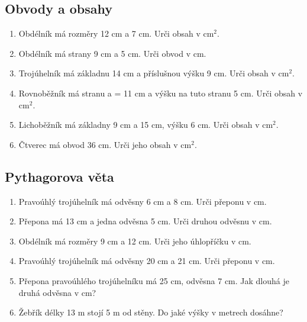 \documentclass[11pt,a4paper]{article}
\begin{document}
\subsection*{Obvody a obsahy}
\begin{enumerate}[label=\arabic*.,start=7,leftmargin=*,itemsep=6pt]
\item Obdélník má rozměry 12 cm a 7 cm. Urči obsah v cm$^2$.\par\vspace{2mm}
\item Obdélník má strany 9 cm a 5 cm. Urči obvod v cm.\par\vspace{2mm}
\item Trojúhelník má základnu 14 cm a příslušnou výšku 9 cm. Urči obsah v cm$^2$.\par\vspace{2mm}
\item Rovnoběžník má stranu a = 11 cm a výšku na tuto stranu 5 cm. Urči obsah v cm$^2$.\par\vspace{2mm}
\item Lichoběžník má základny 9 cm a 15 cm, výšku 6 cm. Urči obsah v cm$^2$.\par\vspace{2mm}
\item Čtverec má obvod 36 cm. Urči jeho obsah v cm$^2$.\par\vspace{2mm}
\end{enumerate}

\subsection*{Pythagorova věta}
\begin{enumerate}[label=\arabic*.,start=13,leftmargin=*,itemsep=6pt]
\item Pravoúhlý trojúhelník má odvěsny 6 cm a 8 cm. Urči přeponu v cm.\par\vspace{2mm}
\item Přepona má 13 cm a jedna odvěsna 5 cm. Urči druhou odvěsnu v cm.\par\vspace{2mm}
\item Obdélník má rozměry 9 cm a 12 cm. Urči jeho úhlopříčku v cm.\par\vspace{2mm}
\item Pravoúhlý trojúhelník má odvěsny 20 cm a 21 cm. Urči přeponu v cm.\par\vspace{2mm}
\item Přepona pravoúhlého trojúhelníku má 25 cm, odvěsna 7 cm. Jak dlouhá je druhá odvěsna v cm?\par\vspace{2mm}
\item Žebřík délky 13 m stojí 5 m od stěny. Do jaké výšky v metrech dosáhne?\par\vspace{2mm}
\end{enumerate}
\end{document}
